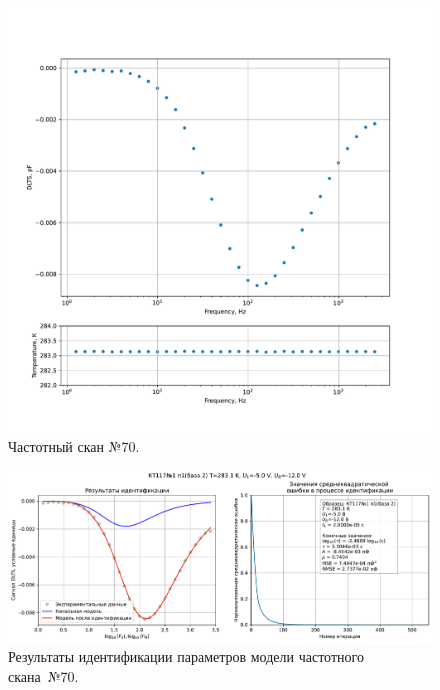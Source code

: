 \begin{figure}[!ht]
    \centering
    \includegraphics[width=1\textwidth]{../plots/КТ117№1_п1(база 2)_2500Гц-1Гц_1пФ_+10С_-5В-12В_200мВ_20мкс_шаг_0,1.pdf}
    \caption{Частотный скан №70.}
    \label{pic:frequency_scan_70}
\end{figure}

\begin{figure}[!ht]
    \centering
    \includegraphics[width=1\textwidth]{../plots/КТ117№1_п1(база 2)_2500Гц-1Гц_1пФ_+10С_-5В-12В_200мВ_20мкс_шаг_0,1_model.pdf}
    \caption{Результаты идентификации параметров модели частотного скана~№70.}
    \label{pic:frequency_scan_model70}
\end{figure}

\pagebreak


